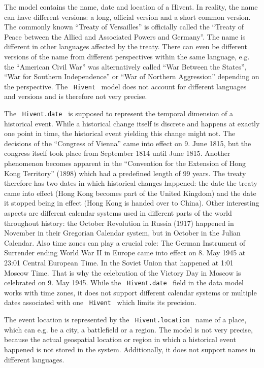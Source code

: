 The model contains the name, date and location of a Hivent. In reality, the name can have different versions: a long, official version and a short common version. The commonly known ``Treaty of Versailles'' is officially called the ``Treaty of Peace between the Allied and Associated Powers and Germany''. The name is different in other languages affected by the treaty. There can even be different versions of the name from different perspectives within the same language, e.g. the ``American Civil War'' was alternatively called ``War Between the States'', ``War for Southern Independence'' or ``War of Northern Aggression'' depending on the perspective.
The ~\texttt{Hivent}~ model does not account for different languages and versions and is therefore not very precise.

The ~\texttt{Hivent.date}~ is supposed to represent the temporal dimension of a historical event. While a historical change itself is discrete and happens at exactly one point in time, the historical event yielding this change might not. The decisions of the ``Congress of Vienna'' came into effect on 9. June 1815, but the congress itself took place from September 1814 until June 1815. Another phenomenon becomes apparent in the ``Convention for the Extension of Hong Kong Territory'' (1898) which had a predefined length of 99 years. The treaty therefore has two dates in which historical changes happened: the date the treaty came into effect (Hong Kong becomes part of the United Kingdom) and the date it stopped being in effect (Hong Kong is handed over to China). Other interesting aspects are different calendar systems used in different parts of the world throughout history: the October Revolution in Russia (1917) happened in November in their Gregorian Calendar system, but in October in the Julian Calendar. Also time zones can play a crucial role: The German Instrument of Surrender ending World War II in Europe came into effect on 8. May 1945 at 23:01 Central European Time. In the Soviet Union that happened at 1:01 Moscow Time. That is why the celebration of the Victory Day in Moscow is celebrated on 9. May 1945. While the ~\texttt{Hivent.date}~ field in the data model works with time zones, it does not support different calendar systems or multiple dates associated with one ~\texttt{Hivent}~ which limits its precision.

The event location is represented by the ~\texttt{Hivent.location}~ name of a place, which can e.g. be a city, a battlefield or a region. The model is not very precise, because the actual geospatial location or region in which a historical event happened is not stored in the system. Additionally, it does not support names in different languages.

